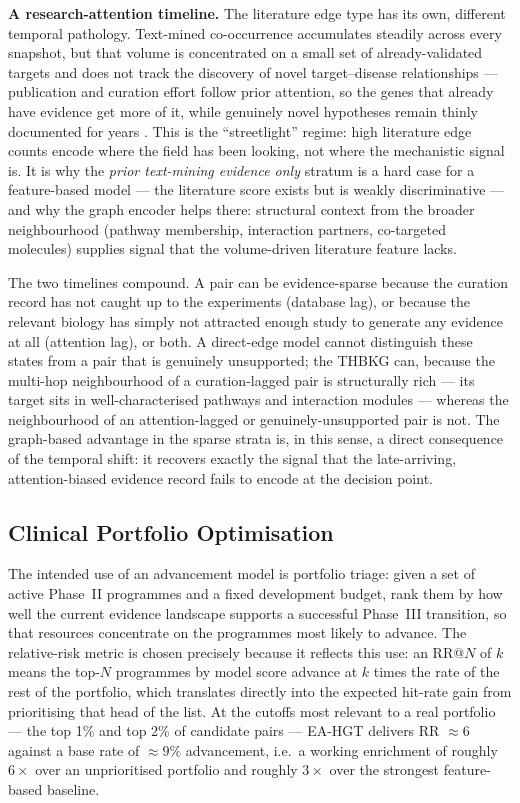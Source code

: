 \documentclass[a4,center]{NAR}
\newcommand{\eahgt}{\textsc{EA-HGT}}
\begin{document}
{\textbf{A research-attention timeline.} The literature edge type has
its own, different temporal pathology. Text-mined co-occurrence
accumulates steadily across every snapshot, but that volume is
concentrated on a small set of already-validated targets and does not
track the discovery of novel target--disease relationships ---
publication and curation effort follow prior attention, so the genes
that already have evidence get more of it, while genuinely novel
hypotheses remain thinly documented for years
\citep{Falaguera2025TemporalDiscovery}. This is the ``streetlight'' regime:
high literature edge counts encode where the field has been looking, not
where the mechanistic signal is. It is why the \emph{prior text-mining
evidence only} stratum is a hard case for a feature-based model --- the
literature score exists but is weakly discriminative --- and why the
graph encoder helps there: structural context from the broader
neighbourhood (pathway membership, interaction partners, co-targeted
molecules) supplies signal that the volume-driven literature feature
lacks.

The two timelines compound. A pair can be evidence-sparse because the
curation record has not caught up to the experiments (database lag), or
because the relevant biology has simply not attracted enough study to
generate any evidence at all (attention lag), or both. A direct-edge
model cannot distinguish these states from a pair that is genuinely
unsupported; the THBKG can, because the multi-hop neighbourhood of a
curation-lagged pair is structurally rich --- its target sits in
well-characterised pathways and interaction modules --- whereas the
neighbourhood of an attention-lagged or genuinely-unsupported pair is
not. The graph-based advantage in the sparse strata is, in this sense,
a direct consequence of the temporal shift: it recovers exactly the
signal that the late-arriving, attention-biased evidence record fails
to encode at the decision point.


\subsection{Clinical Portfolio Optimisation}
\label{sec:discussion_portfolio}

The intended use of an advancement model is portfolio triage: given a
set of active Phase~II programmes and a fixed development budget, rank
them by how well the current evidence landscape supports a successful
Phase~III transition, so that resources concentrate on the programmes
most likely to advance. The relative-risk metric is chosen precisely
because it reflects this use: an RR@$N$ of $k$ means the top-$N$
programmes by model score advance at $k$ times the rate of the rest of
the portfolio, which translates directly into the expected hit-rate gain
from prioritising that head of the list. At the cutoffs most relevant to
a real portfolio --- the top 1\% and top 2\% of candidate pairs ---
\eahgt{} delivers RR $\approx 6$ against a base rate of $\approx 9\%$
advancement, i.e.\ a working enrichment of roughly $6\times$ over an
unprioritised portfolio and roughly $3\times$ over the strongest
feature-based baseline.

}
\end{document}
